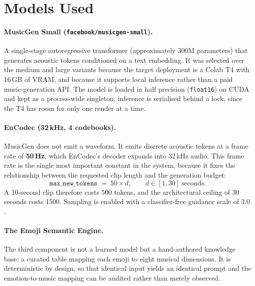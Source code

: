 \documentclass[11pt]{article}
\begin{document}
\section{Models Used}

\paragraph{MusicGen Small (\texttt{facebook/musicgen-small}).}
A single-stage autoregressive transformer (approximately 300M parameters)
that generates acoustic tokens conditioned on a text embedding. It was
selected over the medium and large variants because the target deployment is
a Colab T4 with 16\,GB of VRAM, and because it supports local inference
rather than a paid music-generation API. The model is loaded in
half precision (\texttt{float16}) on CUDA and kept as a process-wide
singleton; inference is serialised behind a lock, since the T4 has room for
only one render at a time.

\paragraph{EnCodec (32\,kHz, 4 codebooks).}
MusicGen does not emit a waveform. It emits discrete acoustic tokens at a
frame rate of \textbf{50\,Hz}, which EnCodec's decoder expands into 32\,kHz
audio. This frame rate is the single most important constant in the system,
because it fixes the relationship between the requested clip length and the
generation budget:
\begin{equation}
\texttt{max\_new\_tokens} \;=\; 50 \times d,
\qquad d \in [1, 30]\ \text{seconds.}
\label{eq:tokens}
\end{equation}
A 10-second clip therefore costs 500 tokens, and the architectural ceiling of
30 seconds costs 1500. Sampling is enabled with a classifier-free guidance
scale of $3.0$.

\paragraph{The Emoji Semantic Engine.}
The third component is not a learned model but a hand-authored knowledge
base: a curated table mapping each emoji to eight musical dimensions. It is
deterministic by design, so that identical input yields an identical prompt
and the emotion-to-music mapping can be audited rather than merely observed.
\end{document}
